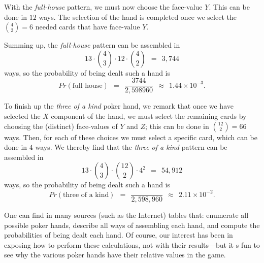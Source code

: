 \begin{itemize}
With the {\it full-house} pattern, we must now choose the face-value $Y$.  This can be done in $12$ ways.
The selection of the hand is completed once we select the $\displaystyle {4 \choose 2} = 6$
needed cards that have face-value $Y$.

Summing up, the {\it full-house} pattern can be assembled in
\[ 13 \cdot {4 \choose 3} \cdot 12 \cdot {4 \choose 2} \ \ = \ \  3,744 \]
ways, so the probability of being dealt such a hand is
\[ 
Pr(\mbox{full house}) \ \ = \ \
\frac{3744}{2,598960}  \ \ \approx \ \ 1.44 \times 10^{-3} . \]

\medskip

To finish up the {\it three of a kind} poker hand, we remark that once we have selected the $X$
component of the hand,  we must select the remaining cards by choosing the (distinct) face-values of
$Y$ and $Z$; this can be done in $\displaystyle {12 \choose 2} = 66$ ways.  Then, for each of these
choices we must select a specific card, which can be done in $4$ ways.  We thereby find that the
{\it three of a kind} pattern can be assembled in
\[ 13 \cdot {4 \choose 3} \cdot {12 \choose 2} \cdot 4^2 \ \ = \ \  54,912 \]
ways, so the probability of being dealt such a hand is
\[ Pr(\mbox{three of a kind}) \ \ = \ \
 \frac{}{2,598,960}  \ \ \approx \ \ 2.11 \times 10^{-2} . \]

\end{itemize}

One can find in many sources (such as the Internet) tables that: enumerate all possible poker hands,
describe all ways of assembling each hand, and compute the probabilities of being dealt each hand.
Of course, our interest has been in exposing how to perform these calculations, not with their
results---but it s fun to see why the various poker hands have their relative values in the game.



